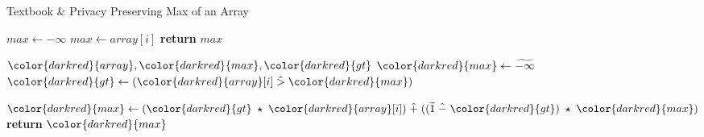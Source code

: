 \begin{algorithm}[H]
\caption{Textbook \& Privacy Preserving Max of an Array}\label{a:max}
\begin{algorithmic}[1]
\renewcommand{\algorithmicrequire}{\textbf{Private Vars:}}

    \State $max  \gets -\infty$
            \State $max \gets array[i]$
        \EndIf
    \EndFor
    \State \textbf{return} {$max$}
\EndProcedure

\begin{spacing}{0.5}
\end{spacing}

\Require ${\color{darkred}{array}}, {\color{darkred}{max}}, {\color{darkred}{gt}}$
    \State ${\color{darkred}{max}} \gets \enc{-\infty}$
        \State ${\color{darkred}{gt}} \gets ({\color{darkred}{array}}[i] \hgt {\color{darkred}{max}})$

        \State ${\color{darkred}{max}} \gets ({\color{darkred}{gt}} \hmul {\color{darkred}{array}}[i]) \hplus ((\enc{1} \hminus {\color{darkred}{gt}}) \hmul {\color{darkred}{max}})$
    \EndFor
    \State \textbf{return} {${\color{darkred}{max}}$}
\EndProcedure

\end{algorithmic}
\end{algorithm}
